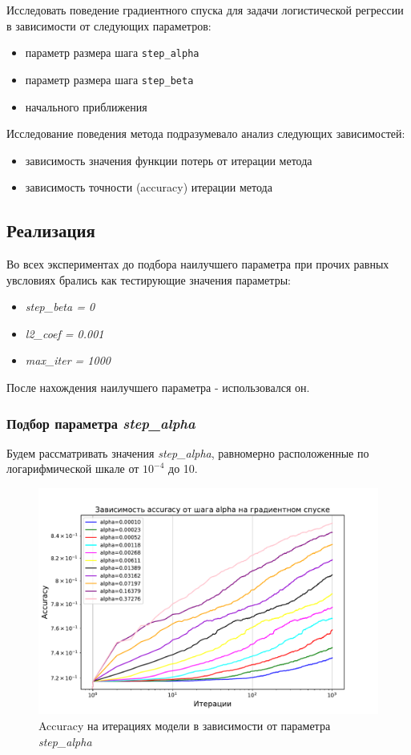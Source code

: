 \documentclass[14pt]{extarticle}
\begin{document}
Исследовать поведение градиентного спуска для задачи логистической регрессии в зависимости от следующих параметров:
\begin{itemize}
    \item параметр размера шага \texttt{step\_alpha}
    \item параметр размера шага \texttt{step\_beta}
    \item начального приближения
\end{itemize}

Исследование поведения метода подразумевало анализ следующих зависимостей:
\begin{itemize}
    \item зависимость значения функции потерь от итерации метода
    \item зависимость точности (accuracy) итерации метода
\end{itemize}

\subsection{Реализация}

Во всех экспериментах до подбора наилучшего параметра при прочих равных увсловиях брались как тестирующие значения параметры:
\begin{itemize}
    \item \textit{step\_beta = 0}
    \item \textit{l2\_coef = 0.001}
    \item \textit{max\_iter = 1000}
\end{itemize}

После нахождения наилучшего параметра - использовался он.

\subsubsection{Подбор параметра \textit{step\_alpha}}

Будем рассматривать значения \textit{step\_alpha}, равномерно расположенные по логарифмической шкале от $ 10^{-4} $ до 10.

\begin{figure}[H]
    \centering
    \includegraphics[width=0.7\linewidth]
    {exp_4_acc_alpha_1.pdf}
    \caption{Accuracy на итерациях модели в зависимости от параметра \textit{step\_alpha}}
    \label{fig:exp_4_acc_alpha_1}
\end{figure}
\end{document}
